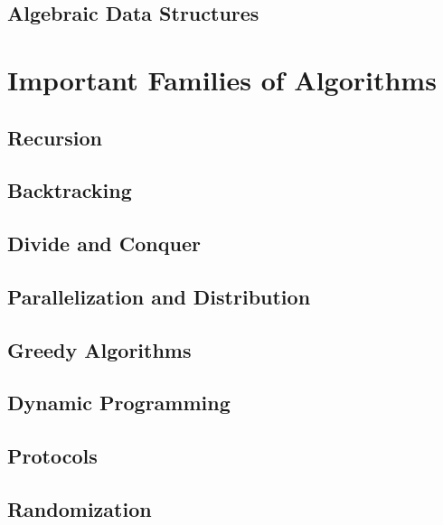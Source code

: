 \documentclass{book}
\begin{document}
\chapter{Algebraic Data Structures}\label{sec:ad:theories}
 

\part{Important Families of Algorithms}\label{sec:ad:algo}

\chapter{Recursion}\label{sec:ad:recurse}
 

\chapter{Backtracking}\label{sec:ad:backtrack}
 

\chapter{Divide and Conquer}\label{sec:ad:divcon}
 

\chapter{Parallelization and Distribution}\label{sec:ad:parallel}
 

\chapter{Greedy Algorithms}\label{sec:ad:greedy}
 

\chapter{Dynamic Programming}\label{sec:ad:dynprog}
 

\chapter{Protocols}\label{sec:ad:prot}
 

\chapter{Randomization}\label{sec:ad:random}
 
 
\end{document}
